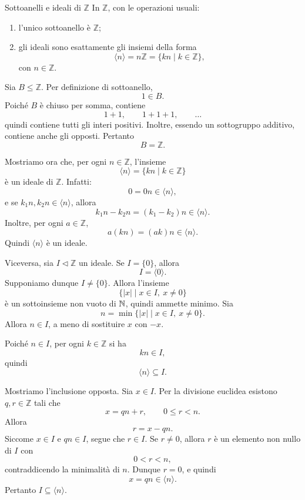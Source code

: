 \documentclass[a4paper]{article}
\begin{document}
\begin{radioactive}
\begin{snippetproposition}{Sottoanelli e ideali di \(\mathbb{Z}\)}
    In \(\mathbb{Z}\), con le operazioni usuali:
    \begin{enumerate}
        \item l'unico sottoanello è \(\mathbb{Z}\);
        \item gli ideali sono esattamente gli insiemi della forma
        \[
            \langle n \rangle=n\mathbb{Z}
            =
            \{kn \mid k \in \mathbb{Z}\},
        \]
        con \(n \in \mathbb{Z}\).
    \end{enumerate}
\end{snippetproposition}
\end{radioactive}

\begin{radioactive}
\begin{snippetproof}{}
    Sia \(B \leq \mathbb{Z}\). Per definizione di sottoanello,
    \[
        1 \in B.
    \]
    Poiché \(B\) è chiuso per somma, contiene
    \[
        1+1,\qquad 1+1+1,\qquad \ldots
    \]
    quindi contiene tutti gli interi positivi. Inoltre, essendo un sottogruppo additivo, contiene anche gli opposti. Pertanto
    \[
        B=\mathbb{Z}.
    \]

    Mostriamo ora che, per ogni \(n \in \mathbb{Z}\), l'insieme
    \[
        \langle n \rangle=\{kn \mid k \in \mathbb{Z}\}
    \]
    è un ideale di \(\mathbb{Z}\). Infatti:
    \[
        0=0n \in \langle n \rangle,
    \]
    e se \(k_1n,k_2n \in \langle n \rangle\), allora
    \[
        k_1n-k_2n=(k_1-k_2)n \in \langle n \rangle.
    \]
    Inoltre, per ogni \(a \in \mathbb{Z}\),
    \[
        a(kn)=(ak)n \in \langle n \rangle.
    \]
    Quindi \(\langle n \rangle\) è un ideale.

    Viceversa, sia \(I \triangleleft \mathbb{Z}\) un ideale.
    Se \(I=\{0\}\), allora
    \[
        I=\langle 0 \rangle.
    \]
    Supponiamo dunque \(I\neq \{0\}\). Allora l'insieme
    \[
        \{|x| \mid x \in I,\ x\neq 0\}
    \]
    è un sottoinsieme non vuoto di \(\mathbb{N}\), quindi ammette minimo.
    Sia
    \[
        n=\min\{|x| \mid x \in I,\ x\neq 0\}.
    \]
    Allora \(n \in I\), a meno di sostituire \(x\) con \(-x\).

    Poiché \(n \in I\), per ogni \(k \in \mathbb{Z}\) si ha
    \[
        kn \in I,
    \]
    quindi
    \[
        \langle n \rangle\subseteq I.
    \]

    Mostriamo l'inclusione opposta. Sia \(x \in I\). Per la divisione euclidea esistono \(q,r \in \mathbb{Z}\) tali che
    \[
        x=qn+r,
        \qquad
        0\leq r<n.
    \]
    Allora
    \[
        r=x-qn.
    \]
    Siccome \(x \in I\) e \(qn \in I\), segue che \(r \in I\).
    Se \(r\neq 0\), allora \(r\) è un elemento non nullo di \(I\) con
    \[
        0<r<n,
    \]
    contraddicendo la minimalità di \(n\). Dunque \(r=0\), e quindi
    \[
        x=qn \in \langle n \rangle.
    \]
    Pertanto \(I\subseteq \langle n \rangle\).


\end{snippetproof}
\end{radioactive}
\end{document}
